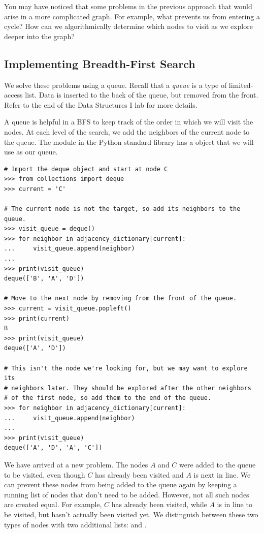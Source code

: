 You may have noticed that some problems in the previous approach that would arise in a more complicated graph.
For example, what prevents us from entering a cycle?
How can we algorithmically determine which nodes to visit as we explore deeper into the graph?

\subsection*{Implementing Breadth-First Search}

We solve these problems using a queue.
Recall that a \emph{queue} is a type of limited-access list.
Data is inserted to the back of the queue, but removed from the front.
Refer to the end of the Data Structures I lab for more details.

A queue is helpful in a BFS to keep track of the order in which we will visit the nodes.
At each level of the search, we add the neighbors of the current node to the queue.
The  module in the Python standard library has a  object that we will use as our queue.

\begin{lstlisting}
# Import the deque object and start at node C
>>> from collections import deque
>>> current = 'C'

# The current node is not the target, so add its neighbors to the queue.
>>> visit_queue = deque()
>>> for neighbor in adjacency_dictionary[current]:
...     visit_queue.append(neighbor)
...
>>> print(visit_queue)
deque(['B', 'A', 'D'])

# Move to the next node by removing from the front of the queue.
>>> current = visit_queue.popleft()
>>> print(current)
B
>>> print(visit_queue)
deque(['A', 'D'])

# This isn't the node we're looking for, but we may want to explore its 
# neighbors later. They should be explored after the other neighbors
# of the first node, so add them to the end of the queue.
>>> for neighbor in adjacency_dictionary[current]:
...     visit_queue.append(neighbor)
...
>>> print(visit_queue)
deque(['A', 'D', 'A', 'C'])
\end{lstlisting}

We have arrived at a new problem.
The nodes $A$ and $C$ were added to the queue to be visited, even though $C$ has already been visited and $A$ is next in line.
We can prevent these nodes from being added to the queue again by keeping a running list of nodes that don't need to be added.
However, not all such nodes are created equal.
For example, $C$ has already been visited, while $A$ is in line to be visited, but hasn't actually been visited yet.
We distinguish between these two types of nodes with two additional lists:  and .

